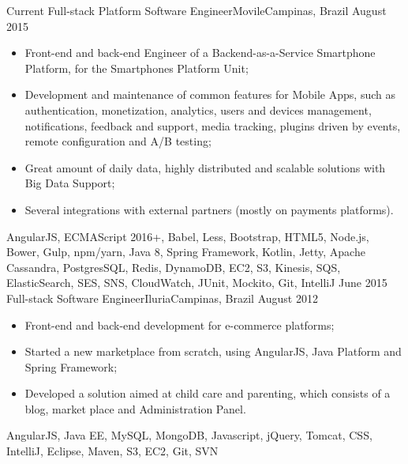 %
%
%

\begin{experiences}
  \experience
    {Current}   {Full-stack Platform Software Engineer}{Movile}{Campinas, Brazil}
    {August 2015} {
    \begin{itemize}
      \item Front-end and back-end Engineer of a Backend-as-a-Service Smartphone Platform,
      for the Smartphones Platform Unit;
      \item Development and maintenance of common features for Mobile Apps, such as authentication,
      monetization, analytics, users and devices management, notifications, feedback and support,
      media tracking, plugins driven by events, remote configuration and A/B testing;
      \item Great amount of daily data, highly distributed and scalable solutions with Big Data Support;
      \item Several integrations with external partners (mostly on payments platforms).\\
    \end{itemize}
  }
  {AngularJS, ECMAScript 2016+, Babel, Less, Bootstrap, HTML5, Node.js, Bower, Gulp, npm/yarn, Java 8, Spring Framework, Kotlin, Jetty, Apache Cassandra, PostgresSQL, Redis, DynamoDB, EC2, S3, Kinesis, SQS, ElasticSearch, SES, SNS, CloudWatch, JUnit, Mockito, Git, IntelliJ}
  \emptySeparator
  \experience
    {June 2015} {Full-stack Software Engineer}{Iluria}{Campinas, Brazil}
    {August 2012}    {
      \begin{itemize}
        \item Front-end and back-end development for e-commerce platforms;
        \item Started a new marketplace from scratch, using AngularJS, Java Platform and Spring Framework;
        \item Developed a solution aimed at child care and parenting, which consists of a blog, market place and Administration Panel.\\
      \end{itemize}
    }{AngularJS, Java EE, MySQL, MongoDB, Javascript, jQuery, Tomcat, CSS, IntelliJ, Eclipse, Maven, S3, EC2, Git, SVN}

\end{experiences}
